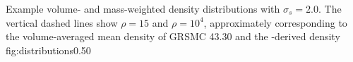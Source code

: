 {  Example volume- and mass-weighted density distributions with
$\sigma_s=2.0$.  The vertical dashed lines show $\rho = 15$ and $\rho=10^4$,
approximately corresponding to the volume-averaged mean density of GRSMC 43.30
and the \formaldehyde-derived density}
{fig:distributions}{0.5}{0}

% 

% 



